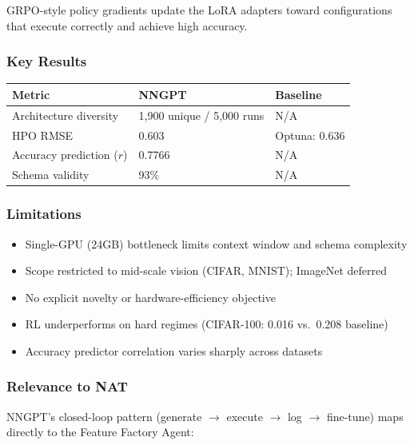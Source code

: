 \documentclass[11pt,a4paper]{article}
\begin{document}
GRPO-style policy gradients update the LoRA adapters toward configurations that execute correctly and achieve high accuracy.

\subsubsection{Key Results}

\begin{center}
\begin{tabular}{l l l}
\hline
\textbf{Metric} & \textbf{NNGPT} & \textbf{Baseline} \\
\hline
Architecture diversity & 1,900 unique / 5,000 runs & N/A \\
HPO RMSE & 0.603 & Optuna: 0.636 \\
Accuracy prediction ($r$) & 0.7766 & N/A \\
Schema validity & 93\% & N/A \\
\hline
\end{tabular}
\end{center}

\subsubsection{Limitations}

\begin{itemize}
    \item Single-GPU (24GB) bottleneck limits context window and schema complexity
    \item Scope restricted to mid-scale vision (CIFAR, MNIST); ImageNet deferred
    \item No explicit novelty or hardware-efficiency objective
    \item RL underperforms on hard regimes (CIFAR-100: 0.016 vs.\ 0.208 baseline)
    \item Accuracy predictor correlation varies sharply across datasets
\end{itemize}

\subsubsection{Relevance to NAT}

NNGPT's closed-loop pattern (generate $\to$ execute $\to$ log $\to$ fine-tune) maps directly to the Feature Factory Agent:
\end{document}
